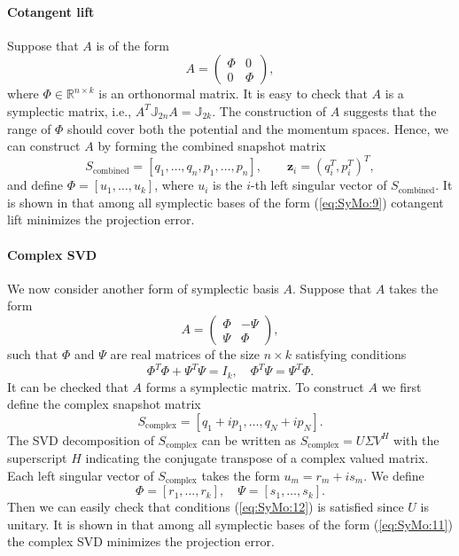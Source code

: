 \paragraph{\bf Cotangent lift} Suppose that $A$ is of the form
\begin{equation} \label{eq:SyMo:9}
	A = 
	\begin{pmatrix}
		\Phi & 0 \\
		0 & \Phi
	\end{pmatrix},
\end{equation}
where $\Phi \in \mathbb{R}^{n\times k}$ is an orthonormal matrix. It is easy to check that $A$ is a symplectic matrix, i.e., $A^T \mathbb J_{2n} A = \mathbb J_{2k}$. The construction of $A$ suggests that the range of $\Phi$ should cover both the potential and the momentum spaces. Hence, we can construct $A$ by forming the combined snapshot matrix
\begin{equation} \label{eq:SyMo:10}
	S_{\text{combined}} = [q_1,\dots,q_n,p_1,\dots,p_n], \qquad \mathbf z_i = (q_i^T,p_i^T)^T,
\end{equation}
and define $\Phi=[u_1,\dots,u_k]$, where $u_i$ is the $i$-th left singular vector of $S_{\text{combined}}$. It is shown in \cite{Peng:2014di} that among all symplectic bases of the form (\ref{eq:SyMo:9}) cotangent lift minimizes the projection error.


\paragraph{\bf Complex SVD} We now consider another form of symplectic basis $A$. Suppose that $A$ takes the form \cite{Peng:2014di}
\begin{equation} \label{eq:SyMo:11}
	A = 
	\begin{pmatrix}
		\Phi & -\Psi \\
		\Psi & \Phi
	\end{pmatrix},
\end{equation}
such that $\Phi$ and $\Psi$ are real matrices of the size $n\times k$ satisfying conditions
\begin{equation} \label{eq:SyMo:12}
\Phi^T \Phi + \Psi^T \Psi = I_k,\quad \Phi^T \Psi = \Psi^T \Phi.
\end{equation}
It can be checked that $A$ forms a symplectic matrix. To construct $A$ we first define the complex snapshot matrix
\begin{equation} \label{eq:SyMo:13}
	S_{\text{complex}} = [ q_1 + i p_1, \dots , q_N + i p_N ].
\end{equation}
The SVD decomposition of $S_{\text{complex}}$ can be written as $S_{\text{complex}} = U \Sigma V^H$ with the superscript $H$ indicating the conjugate transpose of a complex valued matrix. Each left singular vector of $S_{\text{complex}}$ takes the form $u_m = r_m + i s_m$. We define
\begin{equation} \label{eq:SyMo:14}
	 \Phi = [r_1,\dots, r_k], \quad \Psi = [s_1,\dots, s_k].
\end{equation}
Then we can easily check that conditions (\ref{eq:SyMo:12}) is satisfied since $U$ is unitary. It is shown in \cite{Peng:2014di} that among all symplectic bases of the form (\ref{eq:SyMo:11}) the complex SVD minimizes the projection error.

